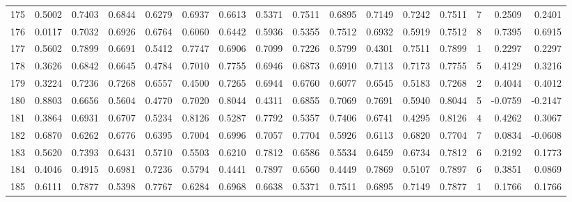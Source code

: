 \begin{tabular}{lrrrrrrrrrrrrrrr}
175 &      0.5002 &  0.7403 &  0.6844 &  0.6279 &  0.6937 &  0.6613 &  0.5371 &  0.7511 &  0.6895 &  0.7149 &   0.7242 &     0.7511 &      7 &                    0.2509 &                     0.2401 \\
176 &      0.0117 &  0.7032 &  0.6926 &  0.6764 &  0.6060 &  0.6442 &  0.5936 &  0.5355 &  0.7512 &  0.6932 &   0.5919 &     0.7512 &      8 &                    0.7395 &                     0.6915 \\
177 &      0.5602 &  0.7899 &  0.6691 &  0.5412 &  0.7747 &  0.6906 &  0.7099 &  0.7226 &  0.5799 &  0.4301 &   0.7511 &     0.7899 &      1 &                    0.2297 &                     0.2297 \\
178 &      0.3626 &  0.6842 &  0.6645 &  0.4784 &  0.7010 &  0.7755 &  0.6946 &  0.6873 &  0.6910 &  0.7113 &   0.7173 &     0.7755 &      5 &                    0.4129 &                     0.3216 \\
179 &      0.3224 &  0.7236 &  0.7268 &  0.6557 &  0.4500 &  0.7265 &  0.6944 &  0.6760 &  0.6077 &  0.6545 &   0.5183 &     0.7268 &      2 &                    0.4044 &                     0.4012 \\
180 &      0.8803 &  0.6656 &  0.5604 &  0.4770 &  0.7020 &  0.8044 &  0.4311 &  0.6855 &  0.7069 &  0.7691 &   0.5940 &     0.8044 &      5 &                   -0.0759 &                    -0.2147 \\
181 &      0.3864 &  0.6931 &  0.6707 &  0.5234 &  0.8126 &  0.5287 &  0.7792 &  0.5357 &  0.7406 &  0.6741 &   0.4295 &     0.8126 &      4 &                    0.4262 &                     0.3067 \\
182 &      0.6870 &  0.6262 &  0.6776 &  0.6395 &  0.7004 &  0.6996 &  0.7057 &  0.7704 &  0.5926 &  0.6113 &   0.6820 &     0.7704 &      7 &                    0.0834 &                    -0.0608 \\
183 &      0.5620 &  0.7393 &  0.6431 &  0.5710 &  0.5503 &  0.6210 &  0.7812 &  0.6586 &  0.5534 &  0.6459 &   0.6734 &     0.7812 &      6 &                    0.2192 &                     0.1773 \\
184 &      0.4046 &  0.4915 &  0.6981 &  0.7236 &  0.5794 &  0.4441 &  0.7897 &  0.6560 &  0.4449 &  0.7869 &   0.5107 &     0.7897 &      6 &                    0.3851 &                     0.0869 \\
185 &      0.6111 &  0.7877 &  0.5398 &  0.7767 &  0.6284 &  0.6968 &  0.6638 &  0.5371 &  0.7511 &  0.6895 &   0.7149 &     0.7877 &      1 &                    0.1766 &                     0.1766 \\

\end{tabular}
